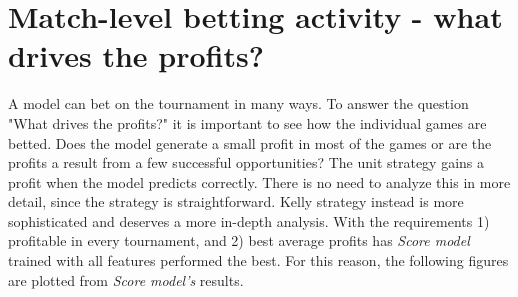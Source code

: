 \section{Match-level betting activity - what drives the profits?}
A model can bet on the tournament in many ways. To answer the question "What drives the profits?" it is important to see how the individual games are betted. Does the model generate a small profit in most of the games or are the profits a result from a few successful opportunities? The unit strategy gains a profit when the model predicts correctly. There is no need to analyze this in more detail, since the strategy is straightforward. Kelly strategy instead is more sophisticated and deserves a more in-depth analysis. With the requirements 1) profitable in every tournament, and 2) best average profits has \textit{Score model} trained with all features performed the best. For this reason, the following figures are plotted from \textit{Score model's} results.


